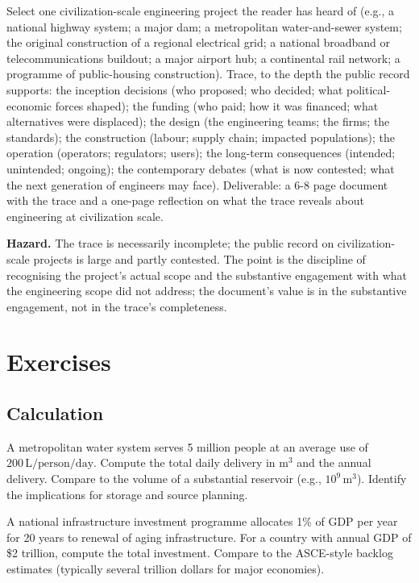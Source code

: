 \begin{project}
Select one civilization-scale engineering project the reader has heard of (e.g., a national highway system; a major dam; a metropolitan water-and-sewer system; the original construction of a regional electrical grid; a national broadband or telecommunications buildout; a major airport hub; a continental rail network; a programme of public-housing construction). Trace, to the depth the public record supports: the inception decisions (who proposed; who decided; what political-economic forces shaped); the funding (who paid; how it was financed; what alternatives were displaced); the design (the engineering teams; the firms; the standards); the construction (labour; supply chain; impacted populations); the operation (operators; regulators; users); the long-term consequences (intended; unintended; ongoing); the contemporary debates (what is now contested; what the next generation of engineers may face). Deliverable: a 6-8 page document with the trace and a one-page reflection on what the trace reveals about engineering at civilization scale.

\textbf{Hazard.} The trace is necessarily incomplete; the public record on civilization-scale projects is large and partly contested. The point is the discipline of recognising the project's actual scope and the substantive engagement with what the engineering scope did not address; the document's value is in the substantive engagement, not in the trace's completeness.
\end{project}

\section{Exercises}

\subsection*{Calculation}

\begin{exercise}
A metropolitan water system serves 5 million people at an average use of $200\,\text{L/person/day}$. Compute the total daily delivery in m$^3$ and the annual delivery. Compare to the volume of a substantial reservoir (e.g., $10^9\,\text{m}^3$). Identify the implications for storage and source planning.
\end{exercise}

\begin{exercise}
A national infrastructure investment programme allocates 1\% of GDP per year for 20 years to renewal of aging infrastructure. For a country with annual GDP of \$2 trillion, compute the total investment. Compare to the ASCE-style backlog estimates (typically several trillion dollars for major economies).
\end{exercise}

